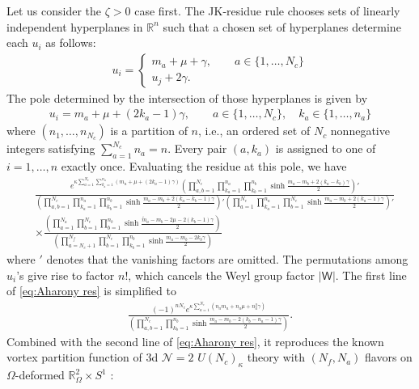 \documentclass[a4paper,11pt]{article}
\begin{document}
Let us consider the $\zeta > 0$ case first. The JK-residue rule chooses sets of linearly independent hyperplanes in $\mathbb R^n$ such that a chosen set of hyperplanes determine each $u_i$ as follows:
\begin{align}
u_i = \left\{\begin{array}{l}
m_a+\mu+\gamma, \qquad a \in \{1,\ldots,N_c\} \\
u_j+2 \gamma.
\end{array}\right.
\end{align}
The pole determined by the intersection of those hyperplanes is given by
\begin{align}
\label{eq:Aharony pole}
u_i = m_a+\mu+(2 k_a-1) \gamma, \qquad a \in \{1,\ldots,N_c\}, \quad k_a \in \{1,\ldots,n_a\}
\end{align}
where $(n_1,\ldots,n_{N_c})$ is a partition of $n$, i.e., an ordered set of $N_c$ nonnegative integers satisfying $\sum_{a = 1}^{N_c} n_a = n$. Every pair $(a,k_a)$ is assigned to one of $i = 1,\ldots,n$ exactly once. Evaluating the residue at this pole, we have
\begin{align}
\label{eq:Aharony res}
%
&\frac{e^{\kappa \sum_{a = 1}^{N_c} \sum_{k_a = 1}^{n_a} (m_a+\mu+(2 k_a-1) \gamma)} \left(\prod_{a,b = 1}^{N_c} \prod_{k_a = 1}^{n_a} \prod_{k_b = 1}^{n_b} \sinh \frac{m_a-m_b+2 (k_a-k_b) \gamma}{2}\right)'}{\left(\prod_{a,b = 1}^{N_c} \prod_{k_a = 1}^{n_a} \prod_{k_b = 1}^{n_b} \sinh \frac{m_a-m_b+2 (k_a-k_b-1) \gamma}{2}\right)' \left(\prod_{a = 1}^{N_c} \prod_{k_a = 1}^{n_a} \prod_{b = 1}^{N_c} \sinh \frac{m_a-m_b+2 (k_a-1) \gamma}{2}\right)'} \nonumber \\
%
&\times \frac{\left(\prod_{a = 1}^{N_a} \prod_{b = 1}^{N_c} \prod_{b = 1}^{n_b} \sinh \frac{\tilde m_a-m_b-2 \mu-2 (k_b-1) \gamma}{2}\right)}{\left(\prod_{a = N_c+1}^{N_f} \prod_{b = 1}^{N_c} \prod_{k_b = 1}^{n_b} \sinh \frac{m_a-m_b-2 k_b \gamma}{2}\right)}
%
\end{align}
where $'$ denotes that the vanishing factors are omitted. The permutations among $u_i$'s give rise to factor $n!$, which cancels the Weyl group factor $|\mathsf W|$. The first line of \eqref{eq:Aharony res} is simplified to
\begin{align}
\frac{(-1)^{n N_c} e^{\kappa \sum_{a = 1}^{N_c}(n_a m_a+n_a \mu+n_a^2 \gamma)}}{\left(\prod_{a,b = 1}^{N_c} \prod_{k_b = 1}^{n_b} \sinh \frac{m_a-m_b-2 (k_b-n_a-1) \gamma}{2}\right)}.
\end{align}
Combined with the second line of \eqref{eq:Aharony res}, it reproduces the known vortex partition function of 3d $\mathcal N = 2$ $U(N_c)_\kappa$ theory with $(N_f,N_a)$ flavors on $\Omega$-deformed $\mathbb R_\Omega^2 \times S^1$ \cite{Hwang:2012jh}:
\end{document}
